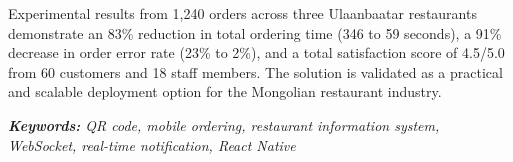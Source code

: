 Experimental results from 1,240 orders across three Ulaanbaatar restaurants demonstrate an 83\% 
reduction in total ordering time (346 to 59 seconds), a 91\% decrease in order error rate (23\% to 
2\%), and a total satisfaction score of 4.5/5.0 from 60 customers and 18 staff members. The solution 
is validated as a practical and scalable deployment option for the Mongolian restaurant industry.

\bigskip
\noindent\textit{\textbf{Keywords:} QR code, mobile ordering, restaurant information system, WebSocket, real-time notification, React Native}

\clearpage
